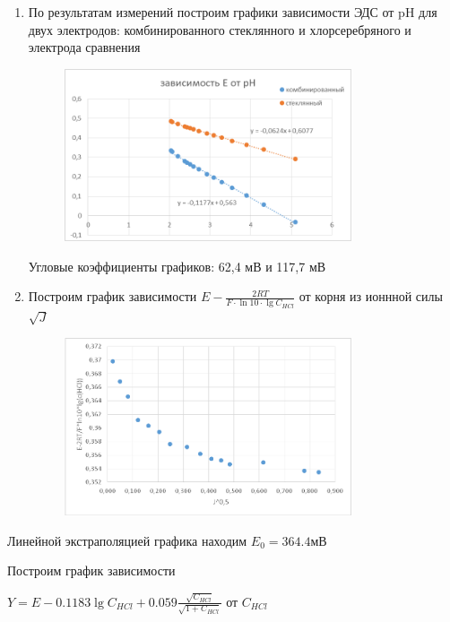 \documentclass[a4paper, 12pt]{article}
\begin{document}
\begin{enumerate}
\item
По результатам измерений построим графики зависимости ЭДС от pH для двух электродов: комбинированного стеклянного и хлорсеребряного и электрода сравнения\\

\begin{figure}[h!]
	\centering
	\caption{}
\includegraphics[width=0.8\textwidth]{image003.png}
\end{figure}
Угловые коэффициенты графиков: 62,4 мВ и 117,7 мВ

\item
Построим график зависимости $E - \frac{2RT}{F\cdot \ln{10}\cdot \lg{C_{HCl}}}$ от корня из ионнной силы $\sqrt{J}$\\

\begin{figure}[h!]
	\centering
	\caption{}
\includegraphics[width=0.8\textwidth]{image005.png}
\end{figure}
\end{enumerate}
Линейной экстраполяцией графика находим $E_0 = 364.4 \text{мВ}$

Построим график зависимости

$Y = E - 0.1183\lg{C_{HCl}} + 0.059 \frac{\sqrt{C_{HCl}}}{\sqrt{1+ C_{HCl}}}$ от $C_{HCl}$\\
\end{document}
